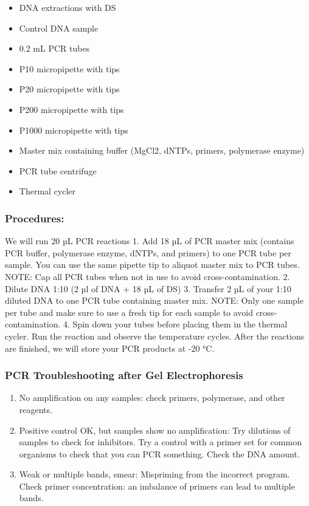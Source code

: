 \documentclass[
  letterpaper,
  DIV=11,
  numbers=noendperiod]{scrreprt}
\providecommand{\tightlist}{%
  \setlength{\itemsep}{0pt}\setlength{\parskip}{0pt}}
\begin{document}
\begin{itemize}
\tightlist
\item
  DNA extractions with DS
\item
  Control DNA sample
\item
  0.2 mL PCR tubes
\item
  P10 micropipette with tips
\item
  P20 micropipette with tips
\item
  P200 micropipette with tips
\item
  P1000 micropipette with tips
\item
  Master mix containing buffer (MgCl2, dNTPs, primers, polymerase
  enzyme)
\item
  PCR tube centrifuge
\item
  Thermal cycler
\end{itemize}

\subsubsection*{Procedures:}\label{procedures-1}

We will run 20 µL PCR reactions 1. Add 18 µL of PCR master mix (contains
PCR buffer, polymerase enzyme, dNTPs, and primers) to one PCR tube per
sample. You can use the same pipette tip to aliquot master mix to PCR
tubes. NOTE: Cap all PCR tubes when not in use to avoid
cross-contamination. 2. Dilute DNA 1:10 (2 µl of DNA + 18 µL of DS) 3.
Transfer 2 µL of your 1:10 diluted DNA to one PCR tube containing master
mix. NOTE: Only one sample per tube and make sure to use a fresh tip for
each sample to avoid cross-contamination. 4. Spin down your tubes before
placing them in the thermal cycler. Run the reaction and observe the
temperature cycles. After the reactions are finished, we will store your
PCR products at -20 °C.

\subsubsection*{PCR Troubleshooting after Gel
Electrophoresis}\label{pcr-troubleshooting-after-gel-electrophoresis}

\begin{enumerate}
\def\labelenumi{\arabic{enumi}.}
\tightlist
\item
  No amplification on any samples: check primers, polymerase, and other
  reagents.
\item
  Positive control OK, but samples show no amplification: Try dilutions
  of samples to check for inhibitors. Try a control with a primer set
  for common organisms to check that you can PCR something. Check the
  DNA amount.
\item
  Weak or multiple bands, smear: Mispriming from the incorrect program.
  Check primer concentration: an imbalance of primers can lead to
  multiple bands.
\end{enumerate}
\end{document}
